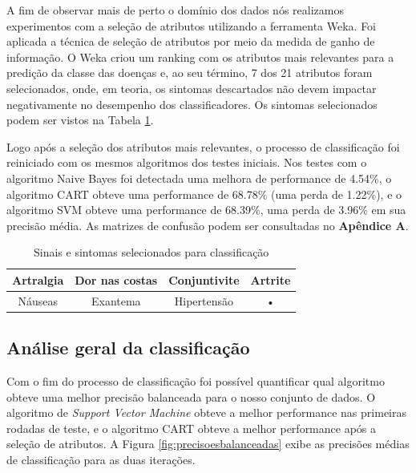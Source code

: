 A fim de observar mais de perto o domínio dos dados nós realizamos experimentos com a seleção de atributos utilizando a ferramenta Weka. Foi aplicada a técnica de seleção de atributos por meio da medida de ganho de informação. O Weka criou um ranking com os atributos mais relevantes para a predição da classe das doenças e, ao seu término,  7 dos 21 atributos foram selecionados, onde, em teoria, os sintomas descartados não devem impactar negativamente no desempenho dos classificadores. Os sintomas selecionados podem ser vistos na Tabela \ref{tab:7colunas}. 

Logo após a seleção dos atributos mais relevantes, o processo de classificação foi reiniciado com os mesmos algoritmos dos testes iniciais. Nos testes com o algoritmo Naive Bayes foi detectada uma melhora de performance de 4.54\%, o algoritmo CART obteve uma performance de 68.78\% (uma perda de 1.22\%), e o algoritmo SVM obteve uma performance de 68.39\%, uma perda de 3.96\% em sua precisão média. As matrizes de confusão podem ser consultadas no \textbf{Apêndice A}.


\begin{table}[h]
\begin{center}
\caption{\label{tab:7colunas}Sinais e sintomas selecionados para classificação}

\begin{tabular}{c|c|c|c}
\hline 
Artralgia & Dor nas costas & Conjuntivite & Artrite \\ 
\hline 
Náuseas & Exantema & Hipertensão & • \\ 
\hline 
\end{tabular} 


\end{center}
\end{table}
\newpage

\subsection{Análise geral da classificação}

Com o fim do processo de classificação foi possível quantificar qual algoritmo obteve uma melhor precisão balanceada para o nosso conjunto de dados. O algoritmo de \textit{Support Vector Machine} obteve a melhor performance nas primeiras rodadas de teste, e o algoritmo CART obteve a melhor performance após a seleção de atributos. A Figura \ref{fig:precisoesbalanceadas} exibe as precisões médias de classificação para as duas iterações.

